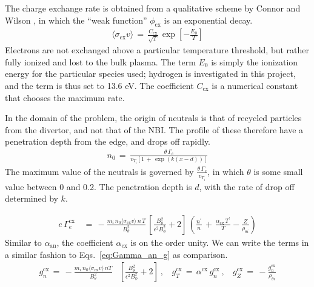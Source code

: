 The charge exchange rate is obtained from a qualitative scheme by Connor and Wilson \cite{connor_review_2000}, in which the ``weak function'' $\phi_\text{cx}$ is an exponential decay.
\begin{align} %
	\langle \sigma_\text{cx} v\rangle \,=\, \frac{C_\text{cx}}{\sqrt{T}} \,
		\exp\left[-\frac{E_0}{T}\right] \label{eq:cx_rate}
\end{align}
Electrons are not exchanged above a particular temperature threshold, but rather fully ionized and lost to the bulk plasma.
The term $E_0$ is simply the ionization energy for the particular species used; hydrogen is investigated in this project, and the term is thus set to 13.6 eV.
The coefficient $C_\text{cx}$ is a numerical constant that chooses the maximum rate.

In the domain of the problem, the origin of neutrals is that of recycled particles from the divertor, and not that of the NBI.
The profile of these therefore have a penetration depth from the edge, and drops off rapidly.
\begin{align} %
	n_0 \,=\, \frac{\theta\,\Gamma_c}{v_{T_i}\left[1 \,+\,
	\exp{(k(x - d))}\right]} \label{eq:neutral_density}
\end{align}
The maximum value of the neutrals is governed by $\frac{\theta\,\Gamma_c}{v_{T_i}}$, in which $\theta$ is some small value between 0 and 0.2.
The penetration depth is $d$, with the rate of drop off determined by $k$.

\begin{align} %
	e\,\Gamma_e^\text{cx} \,&=\,
		-\frac{m_i \,n_0 \langle\sigma_\text{cx} v\rangle \, n\,T}{B_\theta^2}
		\, \left[\frac{B_\theta^2}{\epsilon^2 B_\phi^2} + 2\right] \,
		\left(\frac{n^\prime}{n} \,+\, \frac{\alpha_\text{cx}\,T^\prime}
		{T} - \frac{Z}{\rho_{\theta i}}\right) \label{eq:Gamma_cx}
\end{align}
Similar to $\alpha_\text{an}$, the coefficient $\alpha_\text{cx}$ is on the order unity.
We can write the terms in a similar fashion to Eqs.~\ref{eq:Gamma_an_g} as comparison.
\begin{align} %
	g_n^\text{cx} \,=\, -\frac{m_i \,n_0 \langle\sigma_\text{cx} v\rangle \,n T}
		{B_\theta^2}& \left[\frac{B_\theta^2}{\epsilon^2 B_\phi^2} + 2\right]
		~,~~~~ g_T^\text{cx} \,=\, \alpha^\text{cx}\,g_n^\text{cx}~,~~~~
		g_Z^\text{cx} \,=\, -\frac{g_n^\text{cx}}{\rho_{\theta i}}
		\label{eq:g_cx}
\end{align}


